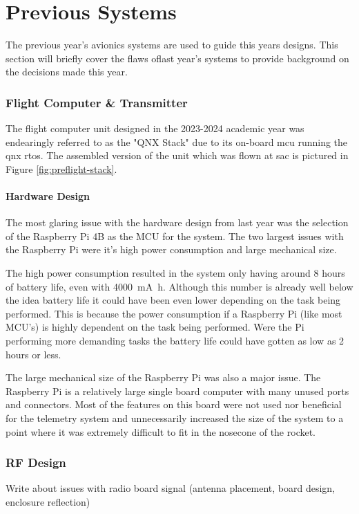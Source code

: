 \part{Previous Systems}

The previous year's avionics systems are used to guide this years designs. This section will briefly cover the flaws
oflast year's systems to provide background on the decisions made this year.

\section{Flight Computer \& Transmitter}

The flight computer unit designed in the 2023-2024 academic year was endearingly referred to as the "QNX Stack" due to
its on-board \gls{mcu} running the \gls{qnx} \gls{rtos}. The assembled version of the unit which was flown at \gls{sac}
is pictured in Figure \ref{fig:preflight-stack}.

\subsection{Hardware Design}

The most glaring issue with the hardware design from last year was the selection of the Raspberry Pi 4B as the MCU for
the system. The two largest issues with the Raspberry Pi were it's high power consumption and large mechanical size.

The high power consumption resulted in the system only having around 8 hours of battery life, even with
\qty{4000}{\milli\ampere\hour}. Although this number is already well below the idea battery life it could have been
even lower depending on the task being performed. This is because the power consumption if a Raspberry Pi (like most
MCU's) is highly dependent on the task being performed. Were the Pi performing more demanding tasks the battery life
could have gotten as low as 2 hours or less.

The large mechanical size of the Raspberry Pi was also a major issue. The Raspberry Pi is a relatively large single
board computer with many unused ports and connectors. Most of the features on this board were not used nor beneficial
for the telemetry system and unnecessarily increased the size of the system to a point where it was extremely difficult
to fit in the nosecone of the rocket.

\section{RF Design}
Write about issues with radio board signal (antenna placement, board design, enclosure reflection) 

